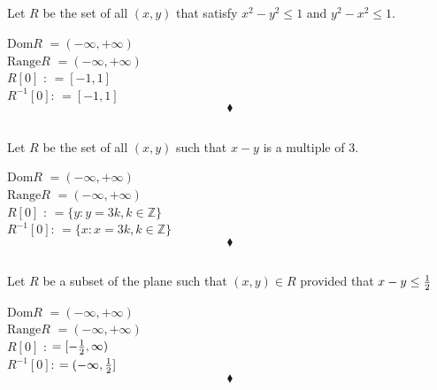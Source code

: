 \subsection{}
\begin{tcolorbox}
 Let $R$ be the set of all $(x,y)$ that satisfy $x^2-y^2\le 1$ and $y^2-x^2 \le 1$.
\end{tcolorbox}
\begin{figure}[H]%
    \centering
    \subfloat[$x^2-y^2\le 1$ and $y^2-x^2 \le 1$]{}
\label{fig:fig_p8b}
\end{figure}
$$ $$
\textbf{$\text{Dom}R$} $=(-\infty,+\infty)$\\
\textbf{$\text{Range} R$} $=(-\infty,+\infty)$\\
\textbf{$R[0]$ }: $=[-1,1]$\\
\textbf{$R^{-1}[0]$}: $=[-1,1]$\\
$$\blacklozenge$$

\subsection{}
\begin{tcolorbox}
 Let $R$ be the set of all $(x,y)$ such that $x-y$ is a multiple of 3.
\end{tcolorbox}
\begin{figure}[H]%
    \centering
    \subfloat[The relation $\{(x,y): y=x-3k, k\in \mathbb{Z}$]{}
\label{fig:fig_p8b}
\end{figure}
$$ $$
\textbf{$\text{Dom}R$} $=(-\infty,+\infty)$\\
\textbf{$\text{Range} R$} $=(-\infty,+\infty)$\\
\textbf{$R[0]$ }: $=\{y: y=3k, k\in\mathbb{Z}\}$\\
\textbf{$R^{-1}[0]$}: $=\{x: x=3k, k\in\mathbb{Z}\}$\\
$$\blacklozenge$$

\subsection{}
\begin{tcolorbox}
 Let $R$ be a subset of the plane such that $(x,y)\in R$ provided that $x-y\le \frac{1}{2}$
\end{tcolorbox}
\begin{figure}[H]%
    \centering
\label{fig:fig_p8b}
\end{figure}
$$ $$
\textbf{$\text{Dom}R$} $=(-\infty,+\infty)$\\
\textbf{$\text{Range} R$} $=(-\infty,+\infty)$\\
\textbf{$R[0]$ }:  $=[-\frac{1}{2},\infty)$\\
\textbf{$R^{-1}[0]$}:  $=(-\infty,\frac{1}{2}]$\\
$$\blacklozenge$$
\newpage

